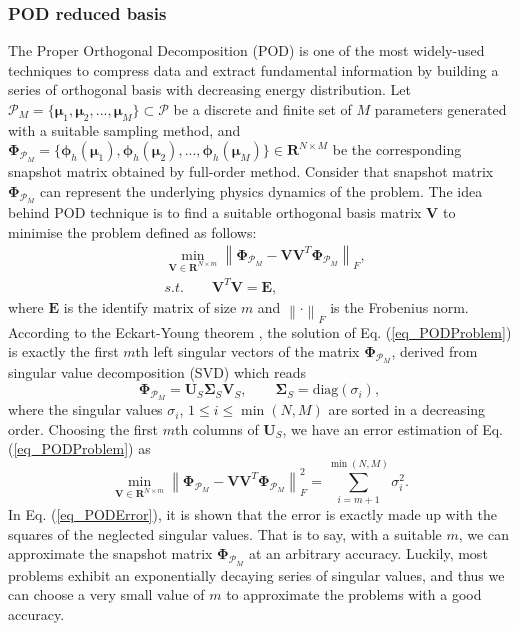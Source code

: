 \documentclass[preprint, 10pt]{elsarticle}
\begin{document}
\subsubsection{POD reduced basis}
The Proper Orthogonal Decomposition (POD) is one of the most widely-used techniques to compress data and extract fundamental information by building a series of orthogonal basis
with decreasing energy distribution.
Let $\mathcal{P}_M=\{\pmb{\mu}_1, \pmb{\mu}_2,...,\pmb{\mu}_M\} \subset \mathcal{P}$ be a discrete and finite set of $M$ parameters generated with a suitable sampling method, and $\pmb {\Phi}_{\mathcal{P}_M}=\{\pmb{\phi}_h(\pmb{\mu}_1), \pmb{\phi}_h(\pmb{\mu}_2),...,\pmb{\phi}_h(\pmb{\mu}_M)\}  \in \mathbf{R}^{N \times M}$ be the corresponding snapshot matrix obtained by full-order method. Consider that snapshot matrix $\pmb {\Phi}_{\mathcal{P}_M}$ can represent the underlying physics dynamics of the problem. The idea behind POD technique is to find a suitable orthogonal basis matrix $\mathbf{V}$ to minimise the problem defined as follows:
\begin{equation}
\begin{aligned}
&\mathop {\min}\limits_{\mathbf{V} \in \mathbf{R}^{N\times m}}
\left\| {\pmb {\Phi}_{\mathcal{P}_M} - \mathbf{V}\mathbf{V}^T \pmb {\Phi}_{\mathcal{P}_M}} \right\|_F, \\
&s.t. \qquad \mathbf{V}^T\mathbf{V} = \mathbf{E},
\end{aligned}
\label{eq_PODProblem}
\end{equation}
where $\mathbf{E}$ is the identify matrix of size $m$ and $\left\| \cdot \right\|_F$ is the Frobenius norm.
According to the Eckart-Young theorem \cite{eckart1936approximation}, the solution of Eq. (\ref{eq_PODProblem}) is exactly  the first $m$th left singular vectors of the matrix $\pmb {\Phi}_{\mathcal{P}_M}$, derived from singular value decomposition (SVD) which reads
\begin{equation}
\pmb {\Phi}_{\mathcal{P}_M} = \mathbf{U}_S \pmb{\Sigma} _S \mathbf{V}_S,
\qquad \pmb{\Sigma} _S = \text{diag} \left(  \sigma _i  \right),
\end{equation}
where  the singular values $\sigma _i$, $1 \le i \le \min(N,M)$ are sorted in a decreasing order. Choosing the first $m$th columns of
 $\mathbf{U}_S$, we have an error estimation of Eq. (\ref{eq_PODProblem}) as
 \begin{equation}
 \mathop {\min}\limits_{\mathbf{V} \in \mathbf{R}^{N\times m}}
\left\| {\pmb {\Phi}_{\mathcal{P}_M} - \mathbf{V}\mathbf{V}^T \pmb {\Phi}_{\mathcal{P}_M}} \right\|_{F}^{2}
=\sum_{i=m+1}^{\min(N,M)} \sigma _{i}^{2}.
\label{eq_PODError}
 \end{equation}
In Eq. (\ref{eq_PODError}), it is shown that the error is exactly made up with  the squares of the neglected singular values. That is to say, with a suitable $m$, we can approximate the snapshot matrix $\pmb {\Phi}_{\mathcal{P}_M}$ at an arbitrary accuracy.  Luckily, most problems exhibit an exponentially decaying series of singular values, and thus we can choose a very small value of $m$ to approximate the problems with a good accuracy.
\end{document}
